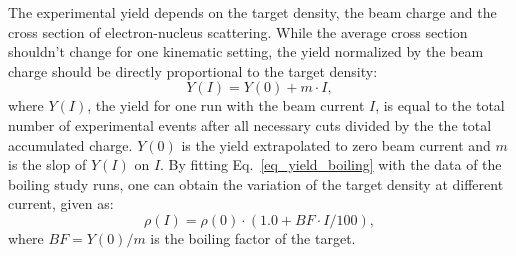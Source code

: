   The experimental yield depends on the target density, the beam charge and the cross section of electron-nucleus scattering. While the average cross section shouldn't change for one kinematic setting, the yield normalized by the beam charge should be directly proportional to the target density:
\begin{equation}
  Y(I) = Y(0) + m\cdot I,
  \label{eq_yield_boiling}
\end{equation}  
where $Y(I)$, the yield for one run with the beam current $I$, is equal to the total number of experimental events after all necessary cuts divided by the the total accumulated charge. $Y(0)$ is the yield extrapolated to zero beam current and $m$ is the slop of $Y(I)$ on $I$. By fitting Eq.~\eqref{eq_yield_boiling} with the data of the boiling study runs, one can obtain the variation of the target density at different current, given as:
\begin{equation}
  \rho(I) = \rho(0) \cdot (1.0 + BF \cdot I /100),
  \label{eq_yield_rho}
\end{equation}
where $BF=Y(0)/m$ is the boiling factor of the target.

